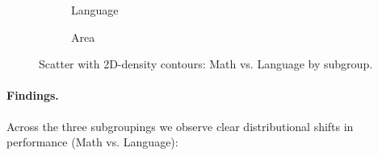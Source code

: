\documentclass[11pt, a4paper]{article}
\begin{document}
\begin{figure}[h]
\begin{subfigure}[t]{0.32\textwidth}
{    }{%
    }
    \caption{Language}
  \end{subfigure}
  \hfill
  \begin{subfigure}[t]{0.32\textwidth}
    \centering
    \caption{Area}
  \end{subfigure}
  \caption{Scatter with 2D-density contours: Math vs. Language by subgroup.}
\end{figure}

\paragraph{Findings.}
Across the three subgroupings we observe clear distributional shifts in performance (Math vs. Language):
\end{document}
